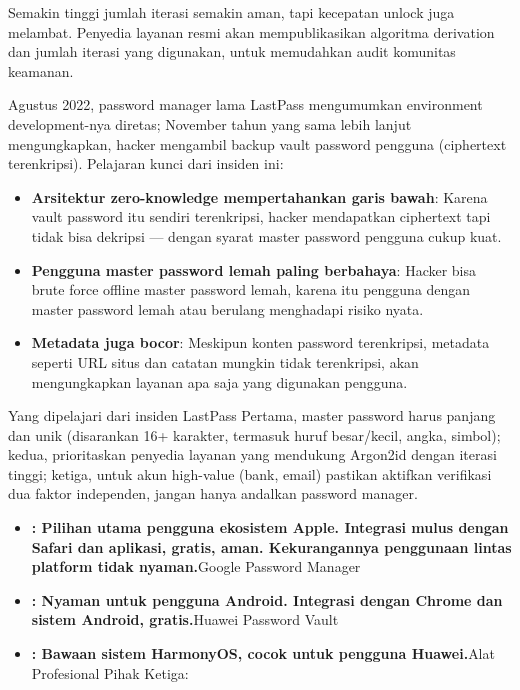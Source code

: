 Semakin tinggi jumlah iterasi semakin aman, tapi kecepatan unlock juga melambat. Penyedia layanan resmi akan mempublikasikan algoritma derivation dan jumlah iterasi yang digunakan, untuk memudahkan audit komunitas keamanan.


Agustus 2022, password manager lama LastPass mengumumkan environment development-nya diretas; November tahun yang sama lebih lanjut mengungkapkan, hacker mengambil backup vault password pengguna (ciphertext terenkripsi). Pelajaran kunci dari insiden ini:

\begin{itemize}
  \item \textbf{Arsitektur zero-knowledge mempertahankan garis bawah}: Karena vault password itu sendiri terenkripsi, hacker mendapatkan ciphertext tapi tidak bisa dekripsi — dengan syarat master password pengguna cukup kuat.
  \item \textbf{Pengguna master password lemah paling berbahaya}: Hacker bisa brute force offline master password lemah, karena itu pengguna dengan master password lemah atau berulang menghadapi risiko nyata.
  \item \textbf{Metadata juga bocor}: Meskipun konten password terenkripsi, metadata seperti URL situs dan catatan mungkin tidak terenkripsi, akan mengungkapkan layanan apa saja yang digunakan pengguna.
\end{itemize}

\begin{tcbwarn}{Yang dipelajari dari insiden LastPass}
Pertama, master password harus panjang dan unik (disarankan 16+ karakter, termasuk huruf besar/kecil, angka, simbol); kedua, prioritaskan penyedia layanan yang mendukung Argon2id dengan iterasi tinggi; ketiga, untuk akun high-value (bank, email) pastikan aktifkan verifikasi dua faktor independen, jangan hanya andalkan password manager.

\end{tcbwarn}



\begin{itemize}
  \item \textbf{: Pilihan utama pengguna ekosistem Apple. Integrasi mulus dengan Safari dan aplikasi, gratis, aman. Kekurangannya penggunaan lintas platform tidak nyaman.}Google Password Manager
  \item \textbf{: Nyaman untuk pengguna Android. Integrasi dengan Chrome dan sistem Android, gratis.}Huawei Password Vault
  \item \textbf{: Bawaan sistem HarmonyOS, cocok untuk pengguna Huawei.}Alat Profesional Pihak Ketiga:
\end{itemize}

